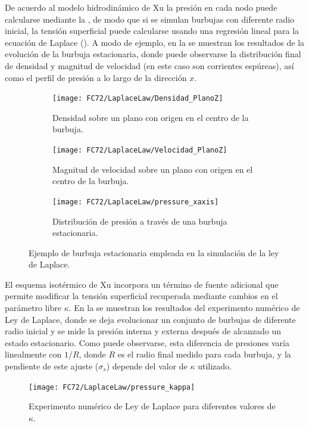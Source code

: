 De acuerdo al modelo hidrodin\'amico de Xu la presi\'on en cada nodo puede calcularse mediante la , de modo que si se simulan burbujas con diferente radio inicial, la tensi\'on superficial puede calcularse usando una regresi\'on lineal para la ecuaci\'on de Laplace (). A modo de ejemplo, en la  se muestran los resultados de la evoluci\'on de la burbuja estacionaria, donde puede observarse la distribuci\'on final de densidad y magnitud de velocidad (en este caso son corrientes esp\'ureas), as\'i como el perfil de presi\'on a lo largo de la direcci\'on $x$.
\begin{figure}[htb]
    \centering
    \begin{subfigure}[t]{0.45\textwidth}
        \centering
        \texttt{[image: FC72/LaplaceLaw/Densidad\_PlanoZ]}
        \caption{Densidad sobre un plano con origen en el centro de la burbuja.}
    \end{subfigure}
    \begin{subfigure}[t]{0.45\textwidth}
        \centering
        \texttt{[image: FC72/LaplaceLaw/Velocidad\_PlanoZ]}
        \caption{Magnitud de velocidad sobre un plano con origen en el centro de la burbuja.}
    \end{subfigure}
    \begin{subfigure}[t]{0.45\textwidth}
        \centering
        \texttt{[image: FC72/LaplaceLaw/pressure\_xaxis]}
        \caption{Distribuci\'on de presi\'on  a trav\'es de una burbuja estacionaria.}
    \end{subfigure}    
    \caption{Ejemplo de burbuja estacionaria empleada en la simulaci\'on de la ley de Laplace.}
    \label{fig:laplace_1_3D}
\end{figure}

El esquema isot\'ermico de Xu incorpora un t\'ermino de fuente adicional que permite modificar la tensi\'on superficial recuperada mediante cambios en el par\'ametro libre $\kappa$. En la  se muestran los resultados del experimento num\'erico de Ley de Laplace, donde se deja evolucionar un conjunto de burbujas de diferente radio inicial y se mide la presi\'on interna y externa despu\'es de alcanzado un estado estacionario. Como puede observarse, esta diferencia de presiones var\'ia linealmente con $1/R$, donde $R$ es el radio final medido para cada burbuja, y la pendiente de este ajuste ($\sigma_s$) depende del valor de $\kappa$ utilizado.

\begin{figure}[ht]
	\centering
	\texttt{[image: FC72/LaplaceLaw/pressure\_kappa]}
	\caption{Experimento num\'erico de Ley de Laplace para diferentes valores de $\kappa$.}
	\label{fig:delta_p_kappa}
\end{figure}

